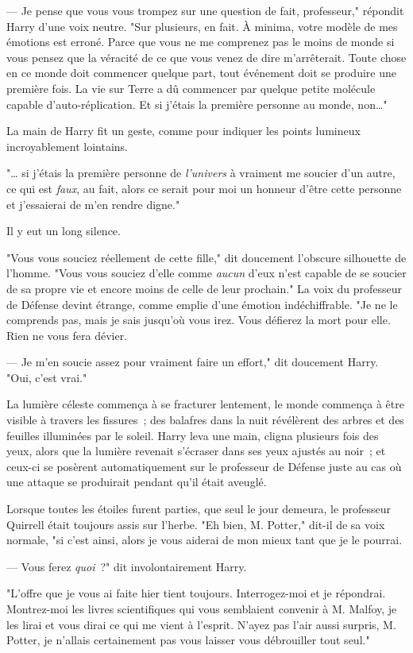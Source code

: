 --- Je pense que vous vous trompez sur une question de fait, professeur," répondit Harry d'une voix neutre. "Sur plusieurs, en fait. À minima, votre modèle de mes émotions est erroné. Parce que vous ne me comprenez pas le moins de monde si vous pensez que la véracité de ce que vous venez de dire m'arrêterait. Toute chose en ce monde doit commencer quelque part, tout événement doit se produire une première fois. La vie sur Terre a dû commencer par quelque petite molécule capable d'auto-réplication. Et si j'étais la première personne au monde, non…"

La main de Harry fit un geste, comme pour indiquer les points lumineux incroyablement lointains.

"… si j'étais la première personne de \emph{l'univers} à vraiment me soucier d'un autre, ce qui est \emph{faux}, au fait, alors ce serait pour moi un honneur d'être cette personne et j'essaierai de m'en rendre digne."

Il y eut un long silence.

"Vous vous souciez réellement de cette fille," dit doucement l'obscure silhouette de l'homme. "Vous vous souciez d'elle comme \emph{aucun} d'eux n'est capable de se soucier de sa propre vie et encore moins de celle de leur prochain." La voix du professeur de Défense devint étrange, comme emplie d'une émotion indéchiffrable. "Je ne le comprends pas, mais je sais jusqu'où vous irez. Vous défierez la mort pour elle. Rien ne vous fera dévier.

--- Je m'en soucie assez pour vraiment faire un effort," dit doucement Harry. "Oui, c'est vrai."

La lumière céleste commença à se fracturer lentement, le monde commença à être visible à travers les fissures~; des balafres dans la nuit révélèrent des arbres et des feuilles illuminées par le soleil. Harry leva une main, cligna plusieurs fois des yeux, alors que la lumière revenait s'écraser dans ses yeux ajustés au noir~; et ceux-ci se posèrent automatiquement sur le professeur de Défense juste au cas où une attaque se produirait pendant qu'il était aveuglé.

Lorsque toutes les étoiles furent parties, que seul le jour demeura, le professeur Quirrell était toujours assis sur l'herbe. "Eh bien, M. Potter," dit-il de sa voix normale, "si c'est ainsi, alors je vous aiderai de mon mieux tant que je le pourrai.

--- Vous ferez \emph{quoi}~?" dit involontairement Harry.

"L'offre que je vous ai faite hier tient toujours. Interrogez-moi et je répondrai. Montrez-moi les livres scientifiques qui vous semblaient convenir à M. Malfoy, je les lirai et vous dirai ce qui me vient à l'esprit. N'ayez pas l'air aussi surpris, M. Potter, je n'allais certainement pas vous laisser vous débrouiller tout seul."

